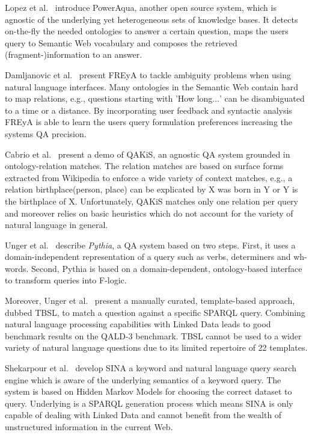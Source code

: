 {Lopez et al.~\cite{poweraqua}} introduce {PowerAqua}, another open source system, which is agnostic of the underlying yet heterogeneous sets of knowledge bases. 
It detects on-the-fly the needed ontologies to answer a certain question, maps the users query to Semantic Web vocabulary and composes the retrieved (fragment-)information to an answer. 

{Damljanovic et al.~\cite{freya}} present {FREyA} to tackle ambiguity problems when using natural language interfaces. 
Many ontologies in the Semantic Web contain hard to map relations, e.g., questions starting with 'How long$\ldots$' can be disambiguated to a time or a distance. 
By incorporating user feedback and syntactic analysis FREyA is able to learn the users query formulation preferences increasing the systems \ac{QA} precision. 

{Cabrio et al.~\cite{qakis}} present a demo of {QAKiS}, an agnostic QA system grounded in ontology-relation matches. 
The relation matches are based on surface forms extracted from Wikipedia to enforce a wide variety of context matches, e.g., a relation birthplace(person, place) can be explicated by X was born in Y or Y is the birthplace of X. 
Unfortunately, QAKiS matches only one relation per query and moreover relies on basic heuristics which do not account for the variety of natural language in general.

{Unger et al.~\cite{pythia}} describe \emph{Pythia}, a \ac{QA} system based on two steps.
First, it uses a domain-independent representation of a query such as verbs, determiners and wh-words.
Second, Pythia is based on a domain-dependent, ontology-based interface to transform queries into F-logic.


Moreover, Unger et al.~\cite{template} present a manually curated, template-based approach, dubbed {TBSL}, to match a question against a specific SPARQL query. 
Combining natural language processing capabilities with Linked Data leads to good benchmark results on the QALD-3 benchmark.
TBSL cannot be used to a wider variety of natural language questions due to its limited repertoire of 22 templates.

{Shekarpour et al.~\cite{SINA_WebSemantic}} develop {SINA} a keyword and natural language query search engine which is aware of the underlying semantics of a keyword query. 
The system is based on Hidden Markov Models for choosing the correct dataset to query.
Underlying is a SPARQL generation process which means SINA is only capable of dealing with Linked Data and cannot benefit from the wealth of unstructured information in the current Web.


